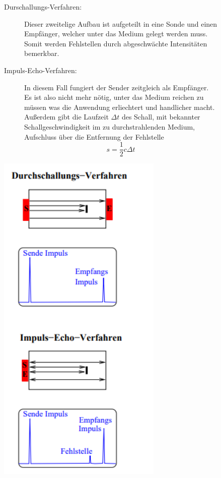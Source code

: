 \begin{figure}
\begin{minipage}{0.5\textwidth}
\begin{description}
    \item [Durschallungs-Verfahren:] Dieser zweitelige Aufbau ist aufgeteilt in eine Sonde und einen Empfänger, welcher unter das Medium gelegt werden muss.
    Somit werden Fehlstellen durch abgeschwächte Intensitäten bemerkbar. \\
    \item [Impuls-Echo-Verfahren:] In diesem Fall fungiert der Sender zeitgleich als Empfänger. Es ist also nicht mehr nötig, unter das Medium reichen zu müssen was die Anwendung 
    erliechtert und handlicher macht. Außerdem gibt die Laufzeit $\Delta t$ des Schall, mit bekannter Schallgeschwindigkeit im zu durchstrahlenden Medium, 
    Aufschluss über die Entfernung der Fehlstelle
    \begin{equation}
        \label{eqn:WegvonSchallDurchEinMediumMitSchallgeschwindkeitCUndLaufzeitDeltaTWoebiDasBestimmtAuchAlsLichgeschwindgeitGesehenwerdenkannwennmankeineahnunghatundnichtdenkontextcheckt.}
        s = \frac{1}{2}c \Delta t
    \end{equation}
\end{description}
\end{minipage}
\hfill
\begin{minipage}{0.4\textwidth}
    \centering
    \includegraphics[width=0.7\textwidth]{Bilder/stuff.png}

\end{minipage}
\end{figure}
